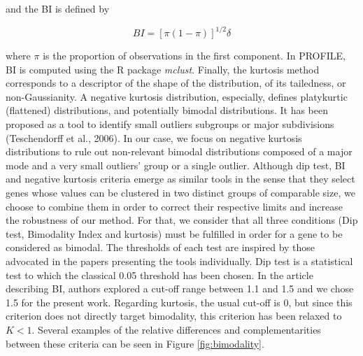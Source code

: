 \documentclass[a4paper,12pt,twoside,onecolumn,openright,final,oldfontcommands]{memoir}
\begin{document}
and the BI is defined by

\[BI=[\pi(1-\pi)]^{1/2}\delta\]

where \(\pi\) is the proportion of observations in the first component.
In PROFILE, BI is computed using the R package \emph{mclust}. Finally,
the kurtosis method corresponds to a descriptor of the shape of the
distribution, of its tailedness, or non-Gaussianity. A negative kurtosis
distribution, especially, defines platykurtic (flattened) distributions,
and potentially bimodal distributions. It has been proposed as a tool to
identify small outliers subgroups or major subdivisions (Teschendorff et
al., 2006). In our case, we focus on negative kurtosis distributions to
rule out non-relevant bimodal distributions composed of a major mode and
a very small outliers' group or a single outlier. Although dip test, BI
and negative kurtosis criteria emerge as similar tools in the sense that
they select genes whose values can be clustered in two distinct groups
of comparable size, we choose to combine them in order to correct their
respective limits and increase the robustness of our method. For that,
we consider that all three conditions (Dip test, Bimodality Index and
kurtosis) must be fulfilled in order for a gene to be considered as
bimodal. The thresholds of each test are inspired by those advocated in
the papers presenting the tools individually. Dip test is a statistical
test to which the classical 0.05 threshold has been chosen. In the
article describing BI, authors explored a cut-off range between 1.1 and
1.5 and we chose 1.5 for the present work. Regarding kurtosis, the usual
cut-off is 0, but since this criterion does not directly target
bimodality, this criterion has been relaxed to \(K < 1\). Several
examples of the relative differences and complementarities between these
criteria can be seen in Figure \ref{fig:bimodality}.
\end{document}
